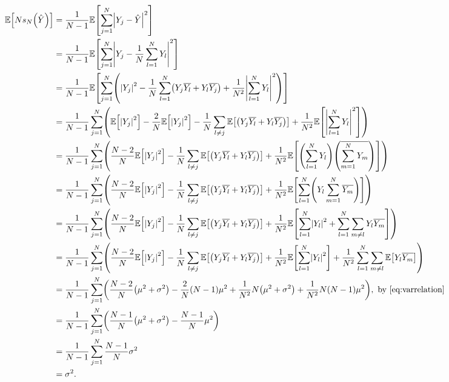 \begin{align*}
  \EXP{N\unbiased{\Yhat}{N}} &= \frac1{N-1} \EXP{\sum_{j=1}^N \abs{\Yj - \Yhat}^2}\\
  &= \frac1{N-1}\EXP{\sum_{j=1}^N \abs{\Yj  - \frac1{N} \sum_{l=1}^N \Yl}^2}\\
  & = \frac1{N-1} \EXP{\sum_{j=1}^N\mleft(\abs{\Yj}^2 - \frac1N \sum_{l=1}^N \mleft(\Yj \Ylbar + \Yl\Yjbar\mright) + \frac1{N^2} \abs{\sum_{l=1}^N  \Yl}^2\mright)}\\
  & = \frac1{N-1} \sum_{j=1}^N\mleft(\EXP{\abs{\Yj}^2} -\frac2N \EXP{\abs{\Yj}^2} -\frac1N \sum_{l\neq j} \EXP{\mleft(\Yj \Ylbar + \Yl\Yjbar\mright)} + \frac1{N^2}\EXP{ \abs{\sum_{l=1}^N  \Yl}^2}\mright)\\
  & = \frac1{N-1} \sum_{j=1}^N\mleft(\frac{N-2}N\EXP{\abs{\Yj}^2}-\frac1N \sum_{l\neq j} \EXP{\mleft(\Yj \Ylbar + \Yl\Yjbar\mright)} + \frac1{N^2}\EXP{ \mleft(\sum_{l=1}^N\Yl\mright)\mleft(\overline{\sum_{m=1}^N  \Ym}\mright)}\mright)\\
  & = \frac1{N-1} \sum_{j=1}^N\mleft(\frac{N-2}N\EXP{\abs{\Yj}^2}-\frac1N \sum_{l\neq j} \EXP{\mleft(\Yj \Ylbar + \Yl\Yjbar\mright)} + \frac1{N^2}\EXP{ \sum_{l=1}^N\mleft(\Yl\sum_{m=1}^N  \Ymbar\mright)}\mright)\\
  & = \frac1{N-1} \sum_{j=1}^N\mleft(\frac{N-2}N\EXP{\abs{\Yj}^2}-\frac1N \sum_{l\neq j} \EXP{\mleft(\Yj \Ylbar + \Yl\Yjbar\mright)} + \frac1{N^2}\EXP{ \sum_{l=1}^N\abs{\Yl}^2 + \sum_{l=1}^N \sum_{m\neq l} \Yl \Ymbar}\mright)\\
  & = \frac1{N-1} \sum_{j=1}^N\mleft(\frac{N-2}N\EXP{\abs{\Yj}^2}-\frac1N \sum_{l\neq j} \EXP{\mleft(\Yj \Ylbar + \Yl\Yjbar\mright)} + \frac1{N^2}\EXP{ \sum_{l=1}^N\abs{\Yl}^2} +\frac1{N^2} \sum_{l=1}^N \sum_{m\neq l} \EXP{\Yl \Ymbar}\mright)\\
  &= \frac1{N-1} \sum_{j=1}^N \mleft(\frac{N-2}N \mleft(\mu^2 + \sigma^2\mright) - \frac2N \mleft(N-1\mright) \mu^2 + \frac1{N^2} N \mleft(\mu^2 + \sigma^2\mright) + \frac1{N^2} N \mleft(N-1\mright) \mu^2\mright),\text{ by \cref{eq:varrelation}}\\
  &= \frac1{N-1} \sum_{j=1}^N \mleft( \frac{N-1}N \mleft(\mu^2 + \sigma^2\mright) - \frac{N-1}{N} \mu^2\mright)\\
  &= \frac1{N-1} \sum_{j=1}^N \frac{N-1}N \sigma^2\\
  &= \sigma^2.
  \end{align*}
\epf
